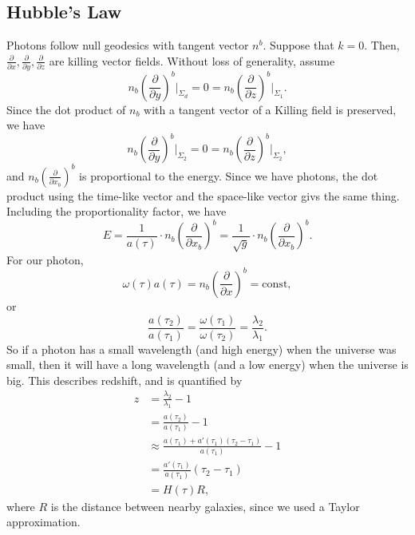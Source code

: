 \documentclass{article}
\numberwithin{equation}{section}
\begin{document}
\subsection{Hubble's Law}
Photons follow null geodesics with tangent vector $n^b.$ Suppose that $k=0.$ Then, $\frac{\partial}{\partial x},\frac{\partial}{\partial y},\frac{\partial}{\partial z}$ are killing vector fields. Without loss of generality, assume 
\begin{equation}
    n_b\left(\frac{\partial}{\partial y}\right)^b \bigg|_{\Sigma_d} = 0 = n_b\left(\frac{\partial}{\partial z}\right)^b \bigg|_{\Sigma_1}.
\end{equation}
Since the dot product of $n_b$ with a tangent vector of a Killing field is preserved, we have 
\begin{equation*}
    n_b\left(\frac{\partial}{\partial y}\right)^b\bigg|_{\Sigma_2} = 0 = n_b\left(\frac{\partial}{\partial z}\right)^b \bigg|_{\Sigma_2},
\end{equation*}
and $n_b\left(\frac{\partial}{\partial x_b}\right)^b$ is proportional to the energy. Since we have photons, the dot product using the time-like vector and the space-like vector givs the same thing. Including the proportionality factor, we have 
\begin{equation*}
    E = \frac{1}{a(\tau)} \cdot n_b \left(\frac{\partial}{\partial x_b}\right)^b = \frac{1}{\sqrt{g}} \cdot n_b \left(\frac{\partial}{\partial x_b}\right)^b.
\end{equation*} 
For our photon,
\begin{equation*}
    \omega(\tau) a(\tau) = n_b\left(\frac{\partial}{\partial x}\right)^b = \text{const},
\end{equation*}
or 
\begin{equation*}
    \frac{a(\tau_2)}{a(\tau_1)} = \frac{\omega(\tau_1)}{\omega(\tau_2)} = \frac{\lambda_2}{\lambda_1}.
\end{equation*}
So if a photon has a small wavelength (and high energy) when the universe was small, then it will have a long wavelength (and a low energy) when the universe is big. This describes redshift, and is quantified by 
\begin{align*}
    z &= \frac{\lambda_2}{\lambda_1} - 1 \\ 
    &= \frac{a(\tau_2)}{a(\tau_1)} - 1 \\ 
    &\approx \frac{a(\tau_1)+a'(\tau_1)(\tau_2-\tau_1)}{a(\tau_1)} - 1 \\
    &= \frac{a'(\tau_1)}{a(\tau_1)} (\tau_2-\tau_1) \\ 
    &= H(\tau)R,
\end{align*}
where $R$ is the distance between nearby galaxies, since we used a Taylor approximation.
\end{document}
